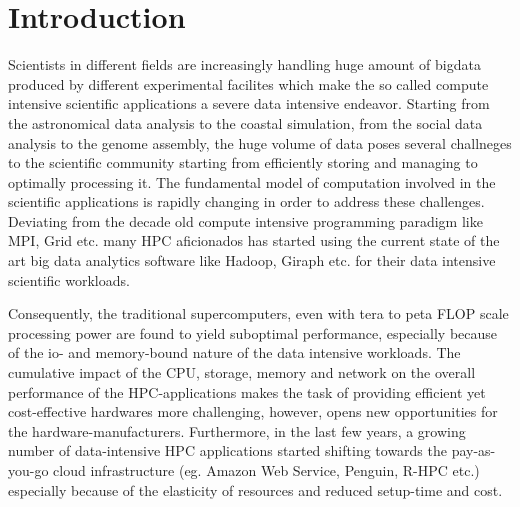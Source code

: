 \documentclass[conference]{IEEEtran}
\begin{document}


%
\IEEEpeerreviewmaketitle



\section {Introduction}
Scientists in different fields are increasingly handling huge amount of bigdata produced by different experimental facilites which make the so called compute intensive scientific applications a severe data intensive endeavor. 
Starting from the astronomical data analysis to the coastal simulation, from the social data analysis to the genome assembly, the huge volume of data poses several challneges to the scientific community starting from efficiently storing and managing to optimally processing it.
The fundamental model of computation involved in the scientific applications is rapidly changing in order to address these challenges.
Deviating from the decade old compute intensive programming paradigm like MPI, Grid etc. many HPC aficionados has started using the current state of the art big data analytics software like Hadoop, Giraph etc. for their data intensive scientific workloads.

Consequently, the traditional supercomputers, even with tera to peta FLOP scale processing power are found to yield suboptimal performance, especially because of the io- and memory-bound nature of the data intensive workloads.
The cumulative impact of the CPU, storage, memory and network on the overall performance of the  HPC-applications makes the task of providing efficient yet cost-effective hardwares more challenging, however, opens new opportunities for the hardware-manufacturers.
Furthermore, in the last few years, a growing number of data-intensive HPC applications started shifting towards the pay-as-you-go cloud infrastructure (eg. Amazon Web Service, Penguin, R-HPC etc.) especially because of the elasticity of resources and reduced setup-time and cost.
\end{document}
